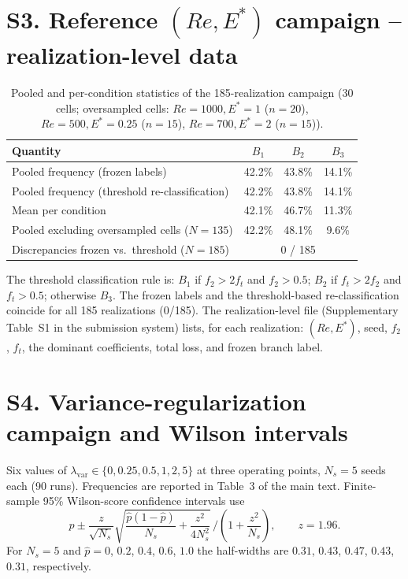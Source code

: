 \documentclass[11pt]{article}
\begin{document}
\section{S3. Reference $(Re,E^*)$ campaign -- realization-level data}
\label{sec:S3}

\begin{table}[h]
\centering\small
\caption{Pooled and per-condition statistics of the 185-realization campaign
(30 cells; oversampled cells: $Re=1000,E^*=1$ ($n=20$),
$Re=500,E^*=0.25$ ($n=15$), $Re=700,E^*=2$ ($n=15$)).}
\label{tab:S3}
\begin{tabular}{lccc}
\toprule
Quantity & $B_1$ & $B_2$ & $B_3$\\
\midrule
Pooled frequency (frozen labels) & 42.2\% & 43.8\% & 14.1\%\\
Pooled frequency (threshold re-classification) & 42.2\% & 43.8\% & 14.1\%\\
Mean per condition & 42.1\% & 46.7\% & 11.3\%\\
Pooled excluding oversampled cells ($N=135$) & 42.2\% & 48.1\% & 9.6\%\\
Discrepancies frozen vs.\ threshold ($N=185$) & \multicolumn{3}{c}{0 / 185}\\
\bottomrule
\end{tabular}
\end{table}

The threshold classification rule is: $B_1$ if $f_2>2f_t$ and $f_2>0.5$;
$B_2$ if $f_t>2f_2$ and $f_t>0.5$; otherwise $B_3$. The frozen labels and the
threshold-based re-classification coincide for all 185 realizations (0/185).
The realization-level file (Supplementary Table~S1 in the submission system)
lists, for each realization: $(Re, E^*)$, seed, $f_2$, $f_t$, the dominant
coefficients, total loss, and frozen branch label.

\section{S4. Variance-regularization campaign and Wilson intervals}
\label{sec:S4}

Six values of $\lambda_{\mathrm{var}}\in\{0,0.25,0.5,1,2,5\}$ at three
operating points, $N_s=5$ seeds each (90 runs). Frequencies are reported in
Table~3 of the main text. Finite-sample 95\% Wilson-score confidence
intervals use
\[
p\pm\frac{z}{\sqrt{N_s}}\sqrt{\frac{\hat p(1-\hat p)}{N_s}+\frac{z^2}{4N_s^2}}
\,\Big/\left(1+\frac{z^2}{N_s}\right),\qquad z=1.96.
\]
For $N_s=5$ and $\hat p=0$, $0.2$, $0.4$, $0.6$, $1.0$ the half-widths are
$0.31$, $0.43$, $0.47$, $0.43$, $0.31$, respectively.
\end{document}
